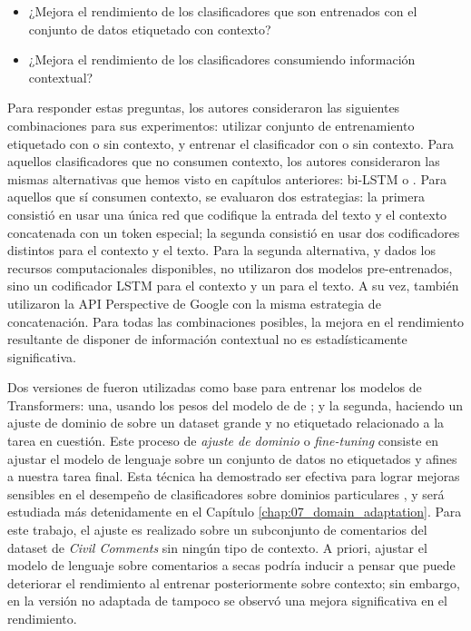\begin{itemize}
    \item ¿Mejora el rendimiento de los clasificadores que son entrenados con el conjunto de datos etiquetado con contexto?
    \item ¿Mejora el rendimiento de los clasificadores consumiendo información contextual?
\end{itemize}

Para responder estas preguntas, los autores consideraron las siguientes combinaciones para sus experimentos: utilizar conjunto de entrenamiento etiquetado con o sin contexto, y entrenar el clasificador con o sin contexto. Para aquellos clasificadores que no consumen contexto, los autores consideraron las mismas alternativas que hemos visto en capítulos anteriores: bi-LSTM o \bert{}. Para aquellos que sí consumen contexto, se evaluaron dos estrategias: la primera consistió en usar una única red que codifique la entrada del texto y el contexto concatenada con un token especial; la segunda consistió en usar dos codificadores distintos para el contexto y el texto. Para la segunda alternativa, y dados los recursos computacionales disponibles, no utilizaron dos modelos pre-entrenados, sino un codificador LSTM para el contexto y un \bert{} para el texto. A su vez, también utilizaron la API Perspective de Google con la misma estrategia de concatenación. Para todas las combinaciones posibles, la mejora en el rendimiento resultante de disponer de información contextual no es estadísticamente significativa.

Dos versiones de \bert{} fueron utilizadas como base para entrenar los modelos de Transformers: una, usando los pesos del modelo de \bert{} de \citet{devlin2018bert}; y la segunda, haciendo un ajuste de dominio de \bert{} sobre un dataset grande y no etiquetado relacionado a la tarea en cuestión. Este proceso de \emph{ajuste de dominio} o \emph{fine-tuning} consiste en ajustar el modelo de lenguaje sobre un conjunto de datos no etiquetados y afines a nuestra tarea final. Esta técnica ha demostrado ser efectiva para lograr mejoras sensibles en el desempeño de clasificadores sobre dominios particulares \cite{gururangan-etal-2020-dont}, y será estudiada más detenidamente en el Capítulo \ref{chap:07_domain_adaptation}. Para este trabajo, el ajuste es realizado sobre un subconjunto de comentarios del dataset de \emph{Civil Comments} \cite{borkan2019civil} sin ningún tipo de contexto. A priori, ajustar el modelo de lenguaje sobre comentarios a secas podría inducir a pensar que puede deteriorar el rendimiento al entrenar posteriormente sobre contexto; sin embargo, en la versión no adaptada de \bert{} tampoco se observó una mejora significativa en el rendimiento.

